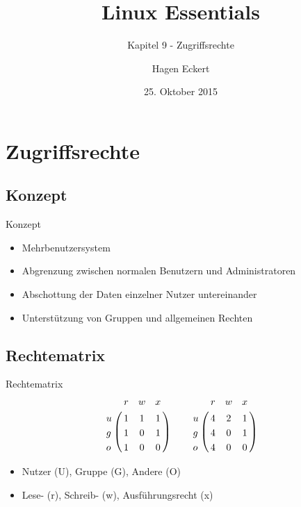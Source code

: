 \documentclass[aspectratio=43]{beamer}
\title[Linux Essentials  - Kapitel 9 - Zugriffsrechte]{Linux Essentials}
\subtitle{Kapitel 9 - Zugriffsrechte}
\author{Hagen Eckert}
\date{25. Oktober 2015}
\begin{document}
\logoframe

\frame{\titlepage}

\setcounter{tocdepth}{1}
\section[Gliederung]{}
\frame{\tableofcontents}
\section{Zugriffsrechte}
\subsection{Konzept}
\begin{frame} 
	\begin{block}{Konzept} 
	\begin{itemize}
	\item Mehrbenutzersystem
	\item Abgrenzung zwischen normalen Benutzern und Administratoren
	\item Abschottung der Daten einzelner Nutzer untereinander
	\item Unterstützung von Gruppen und allgemeinen Rechten
	\end{itemize}
	\end{block}


\end{frame}

\subsection{Rechtematrix}

\begin{frame} 
	\begin{block}{Rechtematrix} 
 \begin{align}
\bordermatrix{
 &r	& w   & x      \cr
u & 1 & 1 & 1  \cr
g & 1 & 0 & 1  \cr
o & 1 & 0 & 0  \cr
}\qquad
\bordermatrix{
 &r	& w   & x      \cr
u & 4 & 2 & 1  \cr
g & 4 & 0 & 1  \cr
o & 4 & 0 & 0  \cr
}\nonumber
 \end{align}
	\begin{itemize}
	\item Nutzer (U), Gruppe (G), Andere (O)
	\item Lese- (r), Schreib- (w), Ausführungsrecht (x)
	\end{itemize}
	\end{block}


\end{frame}
\end{document}
